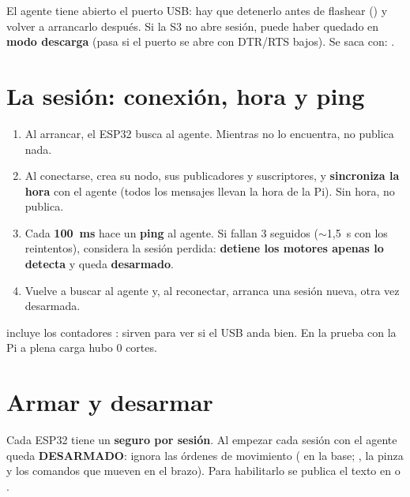 \begin{nota}
El agente tiene abierto el puerto USB: hay que detenerlo antes de flashear () y volver a
arrancarlo después. Si la S3 no abre sesión, puede haber quedado en \textbf{modo descarga} (pasa si el puerto se abre con
DTR/RTS bajos). Se saca con:
.
\end{nota}

\section{La sesión: conexión, hora y ping}

\begin{enumerate}
  \item Al arrancar, el ESP32 busca al agente. Mientras no lo encuentra, no publica nada.
  \item Al conectarse, crea su nodo, sus publicadores y suscriptores, y \textbf{sincroniza la hora} con el agente
        (todos los mensajes llevan la hora de la Pi). Sin hora, no publica.
  \item Cada \textbf{100~ms} hace un \textbf{ping} al agente. Si fallan 3 seguidos ($\sim$1,5~s con los reintentos),
        considera la sesión perdida: \textbf{detiene los motores apenas lo detecta} y queda \textbf{desarmado}.
  \item Vuelve a buscar al agente y, al reconectar, arranca una sesión nueva, otra vez desarmada.
\end{enumerate}

 incluye los contadores : sirven para ver si el USB anda
bien. En la prueba con la Pi a plena carga hubo 0 cortes.

\section{Armar y desarmar}\label{sec:armar}

\begin{idea}
Cada ESP32 tiene un \textbf{seguro por sesión}. Al empezar cada sesión con el agente queda \textbf{DESARMADO}: ignora
las órdenes de movimiento ( en la base; , la pinza y los comandos que mueven
en el brazo). Para habilitarlo se publica el texto  en  o .
\end{idea}

